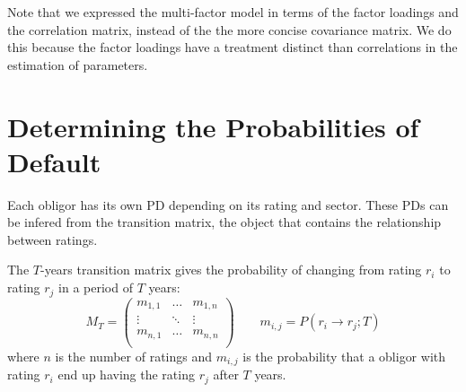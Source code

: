 \documentclass[11pt,fleqn]{book} %
\begin{document}
Note that  we expressed the multi-factor model in terms of the factor 
loadings and the correlation matrix, instead of the the more concise 
covariance matrix. We do this because the factor loadings have a treatment 
distinct than correlations in the estimation of parameters.


\section{Determining the Probabilities of Default}

Each obligor has its own PD depending on its rating and sector. These
PDs can be infered from the transition matrix, the object that contains
the relationship between ratings.

\begin{definition} 
	The $T$-years transition matrix gives the probability of changing 
	from rating $r_i$ to rating $r_j$ in a period of $T$ years:
	\begin{displaymath}
		M_T = \left(
		\begin{array}{ccc}
			m_{1,1} & \dots  & m_{1,n} \\
			\vdots  & \ddots & \vdots  \\
			m_{n,1} & \dots  & m_{n,n} \\
		\end{array}
		\right)
		\qquad
		m_{i,j} = P(r_i \to r_j;T)
	\end{displaymath}
	where $n$ is the number of ratings and $m_{i,j}$ is the probability that a
	obligor with rating $r_i$ end up having the rating $r_j$ after $T$ years.
\end{definition}
\end{document}
